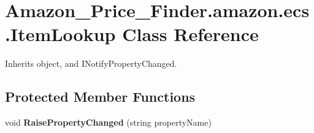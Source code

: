 \hypertarget{class_amazon___price___finder_1_1amazon_1_1ecs_1_1_item_lookup}{\section{Amazon\-\_\-\-Price\-\_\-\-Finder.\-amazon.\-ecs.\-Item\-Lookup Class Reference}
\label{class_amazon___price___finder_1_1amazon_1_1ecs_1_1_item_lookup}
}


 




Inherits object, and I\-Notify\-Property\-Changed.

\subsection*{Protected Member Functions}
\begin{DoxyCompactItemize}
\item 
\hypertarget{class_amazon___price___finder_1_1amazon_1_1ecs_1_1_item_lookup_af81d783fb536c94180a1255c1ae17859}{void {\bfseries Raise\-Property\-Changed} (string property\-Name)}\label{class_amazon___price___finder_1_1amazon_1_1ecs_1_1_item_lookup_af81d783fb536c94180a1255c1ae17859}

\end{DoxyCompactItemize}
